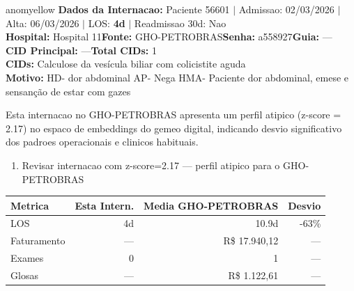 \documentclass[a4paper,10pt]{article}
\begin{document}
\begin{anomalycard}[Internacao 167396 | GHO-PETROBRAS | MODERADO (z=2.17)]{anomyellow}
\textbf{Dados da Internacao:} Paciente 56601 $\mid$ Admissao: 02/03/2026 $\mid$ Alta: 06/03/2026 $\mid$ LOS: \textbf{4d} $\mid$ Readmissao 30d: Nao\\
\textbf{Hospital:} Hospital 11\quad\textbf{Fonte:} GHO-PETROBRAS\quad\textbf{Senha:} a558927\quad\textbf{Guia:} ---\\
\textbf{CID Principal:} {\small ---}\quad\textbf{Total CIDs:} 1\\

\textbf{CIDs:} {\scriptsize Calculose da vesícula biliar com colicistite aguda}\\

\textbf{Motivo:} {\scriptsize HD-  dor abdominal   AP- Nega   HMA-  Paciente dor abdominal, emese e sensanção de estar com gazes}\\

\vspace{2pt}\begin{tcolorbox}[colback=severityred!20,colframe=anomyellow,title={\textbf{Interpretacao de Negocio}},fonttitle=\bfseries\small,left=4pt,right=4pt,top=3pt,bottom=3pt]
{\small Esta internacao no GHO-PETROBRAS apresenta um perfil atipico (z-score = 2.17) no espaco de embeddings do gemeo digital, indicando desvio significativo dos padroes operacionais e clinicos habituais.}
\end{tcolorbox}
\begin{tcolorbox}[colback=severityyellow!30,colframe=anomorange,title={\textbf{Recomendacoes Especificas}},fonttitle=\bfseries\small,left=4pt,right=4pt,top=3pt,bottom=3pt]
\begin{enumerate}[nosep,leftmargin=16pt]
\item {\small Revisar internacao com z-score=2.17 --- perfil atipico para o GHO-PETROBRAS}
\end{enumerate}
\end{tcolorbox}
\begin{center}\begin{tabular}{l r r r}\toprule\textbf{Metrica} & \textbf{Esta Intern.} & \textbf{Media GHO-PETROBRAS} & \textbf{Desvio} \\\midrule
LOS & 4d & 10.9d & -63\% \\
Faturamento & --- & R\$ 17.940,12 & --- \\
Exames & 0 & 1 & --- \\
Glosas & --- & R\$ 1.122,61 & --- \\
\bottomrule\end{tabular}\end{center}


\end{anomalycard}
\end{document}
